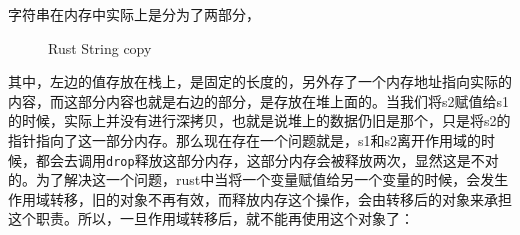 \documentclass[12pt]{article}
\begin{document}
\begin{Shaded}
\begin{Highlighting}[]
\OperatorTok{=} \PreprocessorTok{::}\NormalTok{)}\OperatorTok{;}
\OperatorTok{=}\OperatorTok{;}
\end{Highlighting}
\end{Shaded}

字符串在内存中实际上是分为了两部分，

\begin{figure}
\centering
\pandocbounded{}
\caption{Rust String copy}
\end{figure}

其中，左边的值存放在栈上，是固定的长度的，另外存了一个内存地址指向实际的内容，而这部分内容也就是右边的部分，是存放在堆上面的。当我们将s2赋值给s1的时候，实际上并没有进行深拷贝，也就是说堆上的数据仍旧是那个，只是将s2的指针指向了这一部分内存。那么现在存在一个问题就是，s1和s2离开作用域的时候，都会去调用\texttt{drop}释放这部分内存，这部分内存会被释放两次，显然这是不对的。为了解决这一个问题，rust中当将一个变量赋值给另一个变量的时候，会发生作用域转移，旧的对象不再有效，而释放内存这个操作，会由转移后的对象来承担这个职责。所以，一旦作用域转移后，就不能再使用这个对象了：
\end{document}
